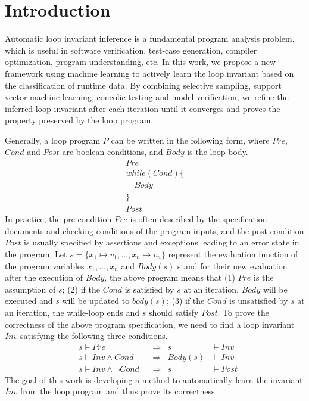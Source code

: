 
\section{Introduction} %
\label{sec:introduction}

Automatic loop invariant inference is a fundamental program analysis problem, 
which is useful in software verification, test-case generation, 
compiler optimization, program understanding, etc. 
In this work, we propose a new framework using machine learning 
to actively learn the loop invariant based on the classification of runtime data. 
By combining selective sampling, support vector machine learning, 
concolic testing and model verification, 
we refine the inferred loop invariant after each iteration 
until it converges and proves the property preserved by the loop program. 

Generally, a loop program $P$ can be written in the following form, 
where $\mathit{Pre}$, $\mathit{Cond}$ and $\mathit{Post}$ are boolean conditions, 
and $\mathit{Body}$ is the loop body. 
\begin{align*}
&Pre&\\
&while (Cond) \{&\\
&  \quad Body & \\
&\} &\\
&Post &
\end{align*}
In practice, the pre-condition $\mathit{Pre}$ is often described by 
the specification documents and checking conditions of the program inputs, 
and the post-condition $\mathit{Post}$ is usually specified 
by assertions and exceptions leading to an error state in the program. 
Let $s = \{ x_1 \mapsto v_1, \ldots, x_n \mapsto v_n \}$ represent 
the evaluation function of the program variables $x_1, \ldots, x_n$
and $\mathit{Body}(s)$ stand for their new evaluation after the execution of $\mathit{Body}$, 
the above program means that (1) $\mathit{Pre}$ is the assumption of $s$; 
(2) if the $\mathit{Cond}$ is satisfied by $s$ at an iteration, 
$\mathit{Body}$ will be executed and $s$ will be updated to $\mathit{body}(s)$; 
(3) if the $\mathit{Cond}$ is unsatisfied by $s$ at an iteration, 
the while-loop ends and $s$ should satisfy $\mathit{Post}$. 
To prove the correctness of the above program specification, 
we need to find a loop invariant $\mathit{Inv}$ satisfying the following three conditions. 
\begin{align}
    &s \models \mathit{Pre} 
        &&\Longrightarrow & s &\models \mathit{Inv} \label{inv:pre} \\
    &s \models \mathit{Inv} \wedge \mathit{Cond} 
        &&\Longrightarrow & \mathit{Body}(s) &\models \mathit{Inv} \label{inv:loop} \\
    &s \models \mathit{Inv} \wedge \neg\mathit{Cond} 
        &&\Longrightarrow & s &\models \mathit{Post} \label{inv:post}
\end{align}
The goal of this work is developing a method to automatically learn 
the invariant $\mathit{Inv}$ from the loop program and thus prove its correctness. 

